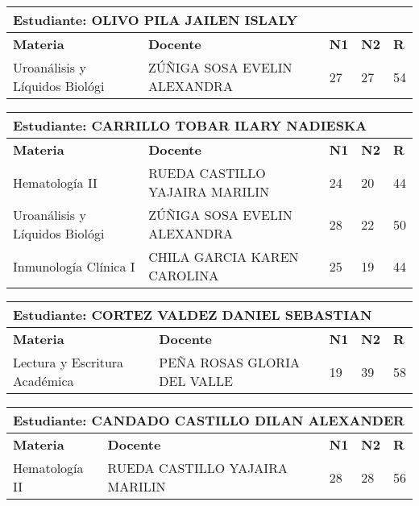 \small
\begin{tabularx}{\textwidth}{|p{5cm}|p{7cm}|X|X|X|}
\hline
\multicolumn{5}{|p{\dimexpr\textwidth-2\tabcolsep-2\arrayrulewidth}|}{\textbf{Estudiante: OLIVO PILA JAILEN ISLALY }}\\\hline
\textbf{Materia} & \textbf{Docente} & \textbf{N1} & \textbf{N2} & \textbf{R} \\ \hline
Uroanálisis y Líquidos Biológi & ZÚÑIGA SOSA EVELIN ALEXANDRA  & 27 & 27& 54 \\ \hline
\end{tabularx}\vspace{10mm}
\small
\begin{tabularx}{\textwidth}{|p{5cm}|p{7cm}|X|X|X|}
\hline
\multicolumn{5}{|p{\dimexpr\textwidth-2\tabcolsep-2\arrayrulewidth}|}{\textbf{Estudiante: CARRILLO TOBAR ILARY NADIESKA }}\\\hline
\textbf{Materia} & \textbf{Docente} & \textbf{N1} & \textbf{N2} & \textbf{R} \\ \hline
Hematología II & RUEDA CASTILLO YAJAIRA MARILIN  & 24 & 20& 44 \\ \hline
Uroanálisis y Líquidos Biológi & ZÚÑIGA SOSA EVELIN ALEXANDRA  & 28 & 22& 50 \\ \hline
Inmunología Clínica I & CHILA GARCIA KAREN CAROLINA  & 25 & 19& 44 \\ \hline
\end{tabularx}\vspace{10mm}
\small
\begin{tabularx}{\textwidth}{|p{5cm}|p{7cm}|X|X|X|}
\hline
\multicolumn{5}{|p{\dimexpr\textwidth-2\tabcolsep-2\arrayrulewidth}|}{\textbf{Estudiante: CORTEZ VALDEZ DANIEL SEBASTIAN }}\\\hline
\textbf{Materia} & \textbf{Docente} & \textbf{N1} & \textbf{N2} & \textbf{R} \\ \hline
Lectura y Escritura Académica & PEÑA ROSAS GLORIA DEL VALLE  & 19 & 39& 58 \\ \hline
\end{tabularx}\vspace{10mm}
\small
\begin{tabularx}{\textwidth}{|p{5cm}|p{7cm}|X|X|X|}
\hline
\multicolumn{5}{|p{\dimexpr\textwidth-2\tabcolsep-2\arrayrulewidth}|}{\textbf{Estudiante: CANDADO CASTILLO DILAN ALEXANDER }}\\\hline
\textbf{Materia} & \textbf{Docente} & \textbf{N1} & \textbf{N2} & \textbf{R} \\ \hline
Hematología II & RUEDA CASTILLO YAJAIRA MARILIN  & 28 & 28& 56 \\ \hline
\end{tabularx}\vspace{10mm}
